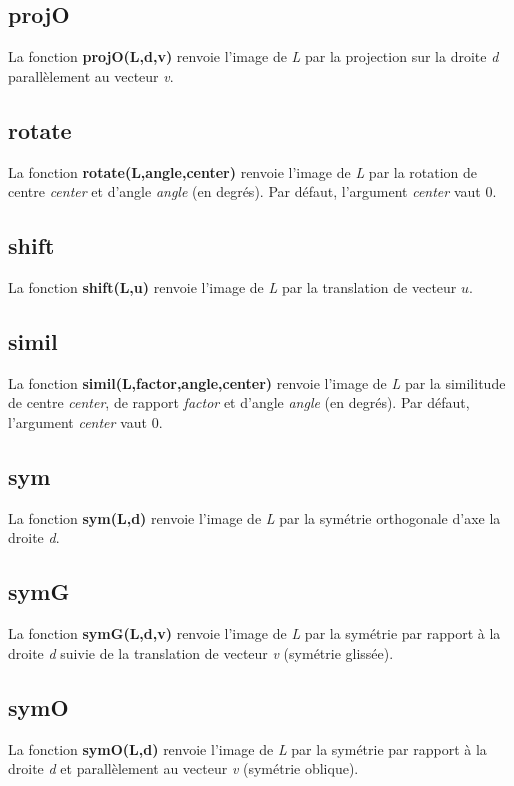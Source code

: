 \subsection{projO}
La fonction \textbf{projO(L,d,v)} renvoie l'image de \emph{L} par la projection sur la droite \emph{d} parallèlement au vecteur \emph{v}.

\subsection{rotate}
La fonction \textbf{rotate(L,angle,center)} renvoie l'image de \emph{L} par la rotation de centre \emph{center} et d'angle \emph{angle} (en degrés). Par défaut, l'argument \emph{center} vaut 0.  

\subsection{shift}
La fonction \textbf{shift(L,u)} renvoie l'image de \emph{L} par la translation de vecteur \(u\).

\subsection{simil}
La fonction \textbf{simil(L,factor,angle,center)} renvoie l'image de \emph{L} par la similitude de centre \emph{center}, de rapport \emph{factor} et d'angle \emph{angle} (en degrés). Par défaut, l'argument \emph{center} vaut 0.

\subsection{sym}
La fonction \textbf{sym(L,d)} renvoie l'image de \emph{L} par la symétrie orthogonale d'axe la droite \emph{d}.

\subsection{symG}
La fonction \textbf{symG(L,d,v)} renvoie l'image de \emph{L} par la symétrie par rapport à la droite \emph{d} suivie de la translation de vecteur \emph{v} (symétrie glissée).

\subsection{symO}
La fonction \textbf{symO(L,d)} renvoie l'image de \emph{L} par la symétrie par rapport à la droite \emph{d} et parallèlement au vecteur \emph{v} (symétrie oblique).

